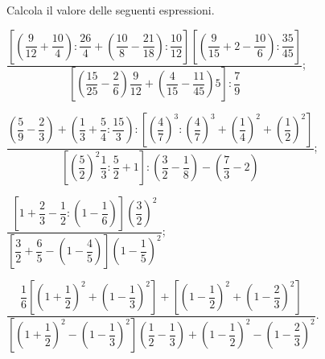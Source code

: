 \begin{esercizio}[\Ast]%
 Calcola il valore delle seguenti espressioni.
\begin{enumeratea}
\spazielenx
\item $\dfrac{\left[\left(\dfrac{9}{12}+\dfrac{10}{4}\right):\dfrac{26}{4}+\left(\dfrac{10}{8}-\dfrac{21}{18}\right):\dfrac{10}{12}\right]\left[\left(\dfrac{9}{15}+2-\dfrac{10}{6}\right):\dfrac{35}{45}\right]}
{\left[\left(\dfrac{15}{25}-\dfrac{2}{6}\right)\dfrac{9}{12}+\left(\dfrac{4}{15}-\dfrac{11}{45}\right)5\right]:\dfrac{7}{9}}$;
\item $\dfrac{\left(\dfrac{5}{9}-\dfrac{2}{3}\right)+\left(\dfrac{1}{3}+\dfrac{5}{4}:\dfrac{15}{3}\right):\left[\left(\dfrac{4}{7}\right)^3:\left(\dfrac{4}{7}\right)^3+\left(\dfrac{1}{4}\right)^2+\left(\dfrac{1}{2}\right)^2\right]}
{\left[\left(\dfrac{5}{2}\right)^2\dfrac{1}{3}:\dfrac{5}{2}+1\right]:\left(\dfrac{3}{2}-\dfrac{1}{8}\right)-\left(\dfrac{7}{3}-2\right)}$;
\item $\dfrac{\left[1+\dfrac{2}{3}-\dfrac{1}{2}:\left(1-\dfrac{1}{6}\right)\right]\left(\dfrac{3}{2}\right)^2}
{\left[\dfrac{3}{2}+\dfrac{6}{5}-\left(1-\dfrac{4}{5}\right)\right]\left(1-\dfrac{1}{5}\right)^2}$;
\item $\dfrac{\dfrac{1}{6}\left[\left(1+\dfrac{1}{2}\right)^2+\left(1-\dfrac{1}{3}\right)^2\right]+\left[\left(1-\dfrac{1}{2}\right)^2+\left(1-\dfrac{2}{3}\right)^2\right]}
{\left[\left(1+\dfrac{1}{2}\right)^2-\left(1-\dfrac{1}{3}\right)^2\right]\left(\dfrac{1}{2}-\dfrac{1}{3}\right)+\left(1-\dfrac{1}{2}\right)^2-\left(1-\dfrac{2}{3}\right)^2}$.
\end{enumeratea}
\end{esercizio}

